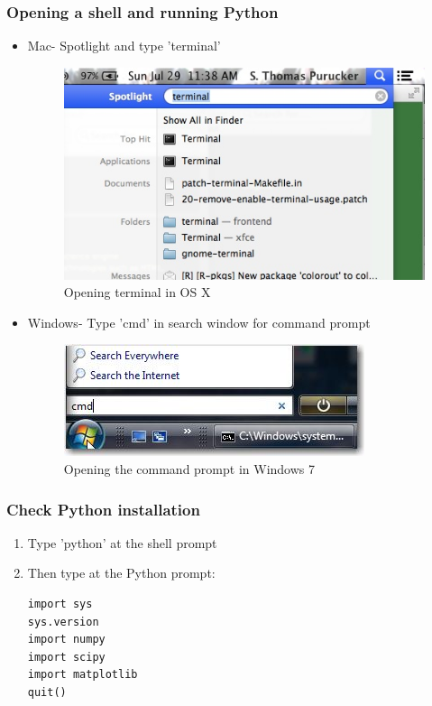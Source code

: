 \documentclass{beamer}
\begin{document}
\begin{frame}[fragile]
\frametitle{Opening a shell and running Python}
\begin{itemize}
  \item{Mac- Spotlight and type 'terminal'}
  \begin{figure}
 \includegraphics[scale=0.2]{mac_terminal.jpg} 
 \caption{Opening terminal in OS X}
\end{figure}
  \item{Windows- Type 'cmd' in search window for command prompt}
  \begin{figure}
 \includegraphics[scale=0.4]{win_cmd.jpg} 
 \caption{Opening the command prompt in Windows 7}
\end{figure}
\end{itemize} 
\end{frame}

\begin{frame}[fragile]
\frametitle{Check Python installation}
\begin{enumerate}
\item Type 'python' at the shell prompt
\item  Then type at the Python prompt:
\begin{lstlisting}
import sys
sys.version
import numpy
import scipy
import matplotlib
quit()
\end{lstlisting} 
\end{enumerate}
\end{frame}
\end{document}
